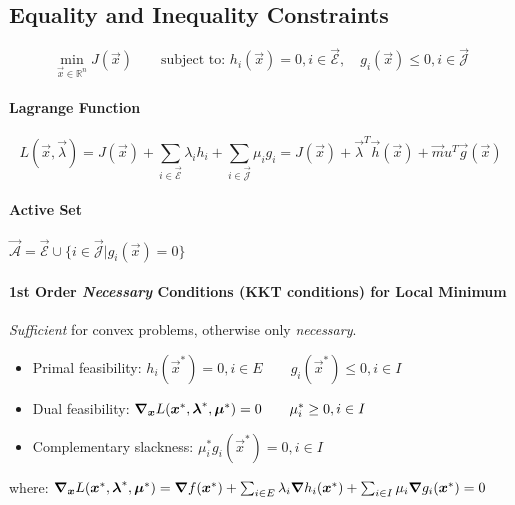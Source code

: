 \subsection{Equality and Inequality Constraints}
\begin{equation*}
\boxed{\min_{\vec x \in \mathbb R^n} J(\vec x) \qquad \text{subject to: } h_i (\vec x) = 0, i \in \vec{\mathcal{E}}, \quad g_i(\vec x) \leq 0, i\in \vec{\mathcal J}}
\end{equation*}
\paragraph{Lagrange Function}
\begin{equation*}
L(\vec x, \vec \lambda) = J(\vec x) + \sum_{i \in \vec{\mathcal{E}}} \lambda_i h_i + \sum_{i \in \vec{\mathcal{J}}} \mu_i g_i = J(\vec x) + \vec \lambda^T \vec h(\vec x) + \vec mu^T \vec g(\vec x)
\end{equation*}
\paragraph{Active Set} $\vec{\mathcal A} = \vec{\mathcal E} \cup \{ i \in \vec{\mathcal{J}} | g_i(\vec x)  = 0 \}$

\paragraph{1st Order \emph{Necessary} Conditions (KKT conditions) for Local Minimum} \emph{Sufficient} for convex problems, otherwise only \emph{necessary}.
\begin{itemize}
	\item Primal feasibility: $h_i(\vec x^\ast) = 0, i \in E \qquad g_i(\vec x^\ast) \leq 0, i \in I$
	\item Dual feasibility: $\grad_{\vec x} L (\vec x^\ast, \vec \lambda^\ast, \vec \mu^\ast) = 0 \qquad \mu_i^\ast \geq 0, i \in I$
	\item Complementary slackness: $\mu_i^\ast g_i(\vec x^\ast) = 0, i \in I$
\end{itemize}
where:
$
\grad_{\vec x}L(\vec x^\ast, \vec \lambda^\ast, \vec \mu^\ast) = \grad f(\vec x^\ast) + \sum_{i \in {{E}}} \lambda_i \grad h_i(\vec x^\ast) + \sum_{i \in {{I}}} \mu_i \grad g_i(\vec x^\ast) = 0
$
